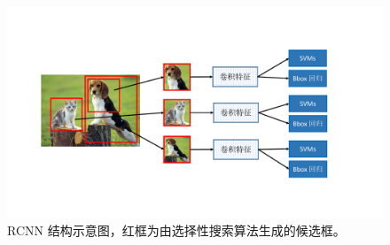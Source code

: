 \begin{figure}[!t]
	\centering
	\includegraphics[trim={3cm, 3.5cm, 5cm, 4cm}, clip, width=\textwidth]{./imgs/RCNN.pdf}
	\caption{RCNN 结构示意图，红框为由选择性搜索算法生成的候选框。}
	\label{fig:rcnn}
\end{figure}
